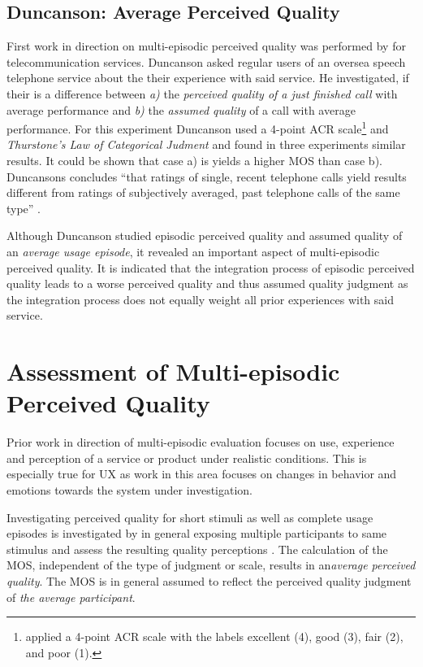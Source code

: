 

\subsection{Duncanson: Average Perceived Quality}
First work in direction on multi-episodic perceived quality was performed by \cite{duncanson_average_1969} for telecommunication services.
Duncanson asked regular users of an oversea speech telephone service about the their experience with said service.
He investigated, if their is a difference between \emph{a)} the \emph{perceived quality of a just finished call} with average performance and \emph{b)} the \emph{assumed quality} of a call with average performance.
For this experiment Duncanson used a 4-point \ac{ACR} scale\footnote{\cite{duncanson_average_1969} applied a 4-point \ac{ACR} scale with the labels excellent (4), good (3), fair (2), and poor (1).} and \emph{Thurstone's Law of Categorical Judment} and found in three experiments similar results.
It could be shown that case a) is yields a higher \ac{MOS} than case b).
Duncansons concludes ``that ratings of single, recent telephone calls
yield results different from ratings of subjectively averaged, past
telephone calls of the same type'' \citep[][p. 116]{duncanson_average_1969}.

Although Duncanson studied episodic perceived quality and assumed quality of an \emph{average usage episode}, it revealed an important aspect of multi-episodic perceived quality.
It is indicated that the integration process of episodic perceived quality leads to a worse perceived quality and thus assumed quality judgment as the integration process does not equally weight all prior experiences with said service.

\section{Assessment of Multi-episodic Perceived Quality}
Prior work in direction of multi-episodic evaluation focuses on use, experience and perception of a service or product under realistic conditions.
This is especially true for \ac{UX} as work in this area focuses on changes in behavior and emotions towards the system under investigation.

Investigating perceived quality for short stimuli as well as complete usage episodes is investigated by in general exposing multiple participants to same stimulus and assess the resulting quality perceptions \citep[\cf][p. 11]{blauert_spatial_1996}. %
The calculation of the \ac{MOS}, independent of the type of judgment or scale, results in an\emph{average perceived quality}.
The \ac{MOS} is in general assumed to reflect the perceived quality judgment of \emph{the average participant}.

